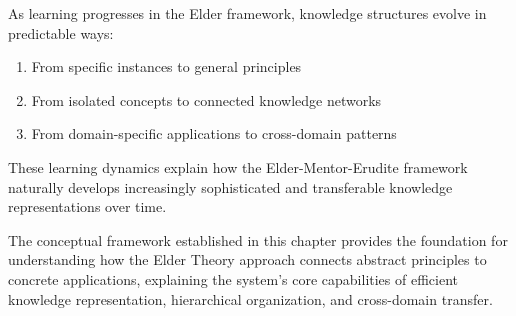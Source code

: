 \begin{theorem}
As learning progresses in the Elder framework, knowledge structures evolve in predictable ways:
\begin{enumerate}
    \item From specific instances to general principles
    \item From isolated concepts to connected knowledge networks
    \item From domain-specific applications to cross-domain patterns
\end{enumerate}
\end{theorem}

These learning dynamics explain how the Elder-Mentor-Erudite framework naturally develops increasingly sophisticated and transferable knowledge representations over time.

The conceptual framework established in this chapter provides the foundation for understanding how the Elder Theory approach connects abstract principles to concrete applications, explaining the system's core capabilities of efficient knowledge representation, hierarchical organization, and cross-domain transfer.